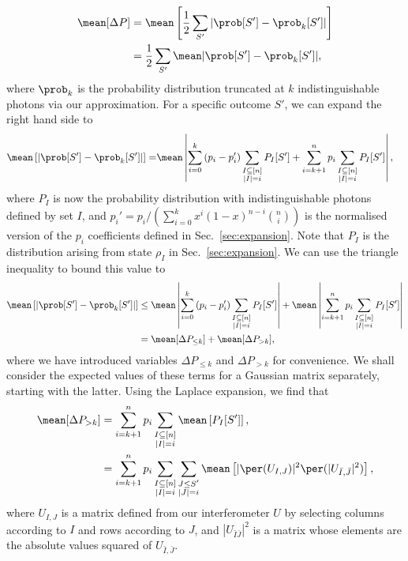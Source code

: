 \begin{align}
\mean[\Delta P] &= \mean\left[\frac{1}{2}\sum_{S'}|\prob[S']-\prob_k[S']|\right]\\
&= \frac{1}{2}\sum_{S'}\mean|\prob[S']-\prob_k[S']| \label{eqn:tvd},
\end{align}
where $\prob_k$ is the probability distribution truncated at $k$ indistinguishable photons via our approximation. For a specific outcome $S'$, we can expand the right hand side to
\begin{align}
\mean\left[|\prob[S']-\prob_k[S']|\right] = &\mean\left|\sum_{i=0}^k\left(p_i-p_i'\right)\sum_{\substack{I\subseteq[n]\\|I|=i}}P_I[S']+\sum_{i=k+1}^np_i\sum_{\substack{I\subseteq[n]\\|I|=i}}P_I[S']\right|,
\end{align}
where $P_I$ is now the probability distribution with indistinguishable photons defined by set $I$, and $p_i'=p_i/(\sum_{i=0}^kx^i(1-x)^{n-i}\binom{n}{i})$ is the normalised version of the $p_i$ coefficients defined in Sec.\ \ref{sec:expansion}. 
Note that $P_I$ is the distribution arising from state $\rho_I$ in Sec.\ \ref{sec:expansion}. 
We can use the triangle inequality to bound this value to
\begin{align}
\mean\left[|\prob[S']-\prob_k[S']|\right] &\leq \mean\left|\sum_{i=0}^k\left(p_i-p_i'\right)\sum_{\substack{I\subseteq[n]\\|I|=i}}P_I[S']\right|+\mean\left|\sum_{i=k+1}^np_i\sum_{\substack{I\subseteq[n]\\|I|=i}}P_I[S']\right|\\
&= \mean[\Delta P_{\leq k}] +\mean[\Delta P_{> k}]\label{eqn:single-outcome-error},
\end{align}
where we have introduced variables $\Delta P_{\leq k}$ and $\Delta P_{> k}$ for convenience. 
We shall consider the expected values of these terms for a Gaussian matrix separately, starting with the latter.
Using the Laplace expansion, we find that
\begin{align}
\mean[\Delta P_{>k}] &= \sum_{i=k+1}^np_i\sum_{\substack{I\subseteq[n]\\|I|=i}}\mean\left[P_I[S']\right],\\
&=\sum_{i=k+1}^np_i\sum_{\substack{I\subseteq[n]\\|I|=i}}\sum_{\substack{J\leq S'\\|J|=i}}\mean\left[|\per(U_{I,J})|^2\per(|U_{\bar{I},\bar{J}}|^2)\right],\label{eqn:laplace}
\end{align}
where $U_{I,J}$ is a matrix defined from our interferometer $U$ by selecting columns according to $I$ and rows according to $J$, and $|U_{\bar{I}\bar{J}}|^2$ is a matrix whose elements are the absolute values squared of $U_{\bar{I},\bar{J}}$.

